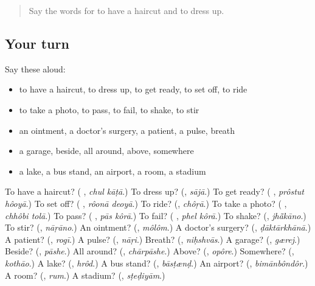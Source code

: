 \label{lesson:BN-R217-second-pass-words-from-chapters-213-217}



\begin{quote}
Say the words for to have a haircut and to dress up.
\end{quote}

\subsection*{Your turn}
Say these aloud:

\begin{itemize}
\raggedright
  \item to have a haircut, to dress up, to get ready, to set off, to ride
  \item to take a photo, to pass, to fail, to shake, to stir
  \item an ointment, a doctor's surgery, a patient, a pulse, breath
  \item a garage, beside, all around, above, somewhere
  \item a lake, a bus stand, an airport, a room, a stadium
\end{itemize}

\begin{tcolorbox}[breakable,colback=teal!4,colframe=teal!35!black,title={Before you move on}]
To have a haircut? (\textbf{ }, \emph{chul kāṭā}.) To dress up? (\textbf{}, \emph{sājā}.) To get ready? (\textbf{ }, \emph{prôstut hôoyā}.) To set off? (\textbf{ }, \emph{rôonā deoyā}.) To ride? (\textbf{}, \emph{chôṛā}.) To take a photo? (\textbf{ }, \emph{chhôbi tolā}.) To pass? (\textbf{ }, \emph{pās kôrā}.) To fail? (\textbf{ }, \emph{phel kôrā}.) To shake? (\textbf{}, \emph{jhā̃kāno}.) To stir? (\textbf{}, \emph{nāṛāno}.) An ointment? (\textbf{}, \emph{môlôm}.) A doctor's surgery? (\textbf{}, \emph{ḍāktārkhānā}.) A patient? (\textbf{}, \emph{rogī}.) A pulse? (\textbf{}, \emph{nāṛi}.) Breath? (\textbf{}, \emph{niḥshvās}.) A garage? (\textbf{}, \emph{gærej}.) Beside? (\textbf{}, \emph{pāshe}.) All around? (\textbf{}, \emph{chārpāshe}.) Above? (\textbf{}, \emph{opôre}.) Somewhere? (\textbf{}, \emph{kothāo}.) A lake? (\textbf{}, \emph{hrôd}.) A bus stand? (\textbf{}, \emph{bāsṭænḍ}.) An airport? (\textbf{}, \emph{bimānbôndôr}.) A room? (\textbf{}, \emph{rum}.) A stadium? (\textbf{}, \emph{sṭeḍiyām}.)
\end{tcolorbox}
